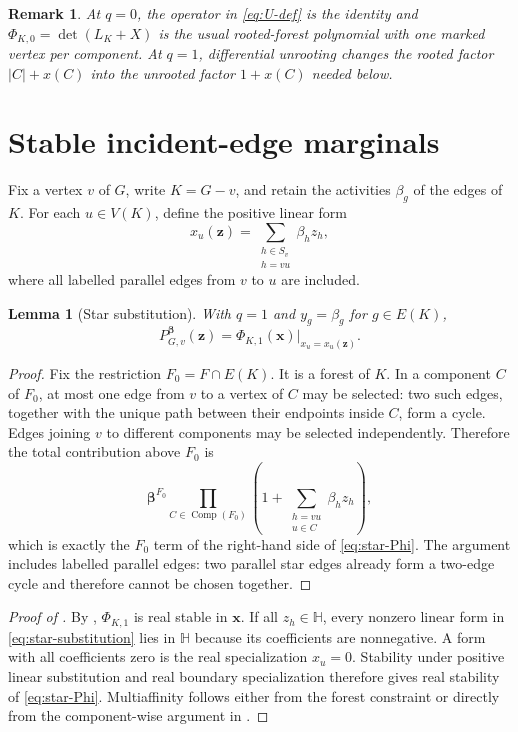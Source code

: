 \documentclass[11pt]{article}
\numberwithin{equation}{section}
\newtheorem{lemma}[theorem]{Lemma}
\newtheorem{remark}[theorem]{Remark}
\newcommand{\Hh}{\mathbb H}
\newcommand{\xx}{\bm x}
\newcommand{\zz}{\bm z}
\newcommand{\betab}{\bm\beta}
\newcommand{\Comp}{\operatorname{Comp}}
\begin{document}
\begin{remark}\label{rem:q-endpoints}
At $q=0$, the operator in \eqref{eq:U-def} is the identity and $\Phi_{K,0}=\det(L_K+X)$ is the usual rooted-forest polynomial with one marked vertex per component.  At $q=1$, differential unrooting changes the rooted factor $|C|+x(C)$ into the unrooted factor $1+x(C)$ needed below.
\end{remark}

\section{Stable incident-edge marginals}\label{sec:star}

Fix a vertex $v$ of $G$, write $K=G-v$, and retain the activities $\beta_g$ of the edges of $K$.  For each $u\in V(K)$, define the positive linear form
\begin{equation}\label{eq:star-substitution}
 x_u(\zz)=
 \sum_{\substack{h\in S_v\\ h=vu}}\beta_hz_h,
\end{equation}
where all labelled parallel edges from $v$ to $u$ are included.

\begin{lemma}[Star substitution]\label{lem:star-substitution}
With $q=1$ and $y_g=\beta_g$ for $g\in E(K)$,
\begin{equation}\label{eq:star-Phi}
 P_{G,v}^{\betab}(\zz)
 =\Phi_{K,1}(\xx)\big|_{x_u=x_u(\zz)}.
\end{equation}
\end{lemma}

\begin{proof}
Fix the restriction $F_0=F\cap E(K)$.  It is a forest of $K$.  In a component $C$ of $F_0$, at most one edge from $v$ to a vertex of $C$ may be selected: two such edges, together with the unique path between their endpoints inside $C$, form a cycle.  Edges joining $v$ to different components may be selected independently.  Therefore the total contribution above $F_0$ is
\[
 \betab^{F_0}
 \prod_{C\in\Comp(F_0)}
 \left(1+\sum_{\substack{h=vu\\u\in C}}\beta_hz_h\right),
\]
which is exactly the $F_0$ term of the right-hand side of \eqref{eq:star-Phi}.  The argument includes labelled parallel edges: two parallel star edges already form a two-edge cycle and therefore cannot be chosen together.
\end{proof}

\begin{proof}[Proof of ]
By , $\Phi_{K,1}$ is real stable in $\xx$.  If all $z_h\in\Hh$, every nonzero linear form in \eqref{eq:star-substitution} lies in $\Hh$ because its coefficients are nonnegative.  A form with all coefficients zero is the real specialization $x_u=0$.  Stability under positive linear substitution and real boundary specialization therefore gives real stability of \eqref{eq:star-Phi}.  Multiaffinity follows either from the forest constraint or directly from the component-wise argument in .
\end{proof}
\end{document}
